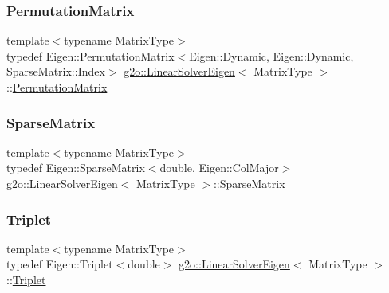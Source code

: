 \subsubsection{\texorpdfstring{Permutation\+Matrix}{PermutationMatrix}}
{\footnotesize\ttfamily template$<$typename Matrix\+Type$>$ \\
typedef Eigen\+::\+Permutation\+Matrix$<$Eigen\+::\+Dynamic, Eigen\+::\+Dynamic, Sparse\+Matrix\+::\+Index$>$ \mbox{\hyperlink{classg2o_1_1_linear_solver_eigen}{g2o\+::\+Linear\+Solver\+Eigen}}$<$ Matrix\+Type $>$\+::\mbox{\hyperlink{classg2o_1_1_linear_solver_eigen_acd9dd4e15dfbbad2720f1b83519333e8}{Permutation\+Matrix}}}

\mbox{\label{classg2o_1_1_linear_solver_eigen_aeb7e2400bed3a249b5f29ce7cc00cd33}} 
\subsubsection{\texorpdfstring{Sparse\+Matrix}{SparseMatrix}}
{\footnotesize\ttfamily template$<$typename Matrix\+Type$>$ \\
typedef Eigen\+::\+Sparse\+Matrix$<$double, Eigen\+::\+Col\+Major$>$ \mbox{\hyperlink{classg2o_1_1_linear_solver_eigen}{g2o\+::\+Linear\+Solver\+Eigen}}$<$ Matrix\+Type $>$\+::\mbox{\hyperlink{classg2o_1_1_linear_solver_eigen_aeb7e2400bed3a249b5f29ce7cc00cd33}{Sparse\+Matrix}}}

\mbox{\label{classg2o_1_1_linear_solver_eigen_a602c24e05d2f46022aa1827fdbc45638}} 
\subsubsection{\texorpdfstring{Triplet}{Triplet}}
{\footnotesize\ttfamily template$<$typename Matrix\+Type$>$ \\
typedef Eigen\+::\+Triplet$<$double$>$ \mbox{\hyperlink{classg2o_1_1_linear_solver_eigen}{g2o\+::\+Linear\+Solver\+Eigen}}$<$ Matrix\+Type $>$\+::\mbox{\hyperlink{classg2o_1_1_linear_solver_eigen_a602c24e05d2f46022aa1827fdbc45638}{Triplet}}}



